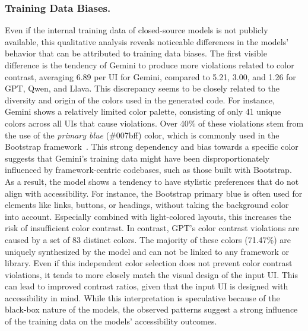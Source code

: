 \subsubsection{Training Data Biases.} Even if the 
internal training data of closed-source models is not publicly 
available, this qualitative analysis reveals noticeable differences 
in the models' behavior that can be attributed to training 
data biases.\newline
The first visible difference is the tendency of Gemini to produce 
more violations related to color contrast, averaging 
6.89 per UI for Gemini, compared to 5.21, 3.00, and 1.26 for GPT,
Qwen, and Llava. This discrepancy seems to be closely related to 
the diversity and origin of the colors used in the generated code.
For instance, Gemini shows a relatively limited color palette, 
consisting of only 41 unique colors across all UIs that cause 
violations. Over 40\% of these violations stem from the use 
of the \textit{primary blue} (\#007bff) color, which is 
commonly used in the Bootstrap framework~\cite{web:bootstrapv4}.
This strong dependency and bias towards a specific color suggests 
that Gemini's training data might have been disproportionately 
influenced by framework-centric codebases, such as those built 
with Bootstrap. As a result, the model shows a tendency to have 
stylistic preferences that do not align with accessibility.
For instance, the Bootstrap primary blue is often used for 
elements like links, buttons, or headings, without taking the 
background color into account. Especially combined with 
light-colored layouts, this increases the risk of insufficient 
color contrast. In contrast, GPT's color contrast violations are 
caused by a set of 83 distinct colors. The majority of these 
colors (71.47\%) are uniquely synthesized by the model and can not 
be linked to any framework or library. Even if this 
independent color selection does not prevent color contrast 
violations, it tends to more closely match the visual 
design of the input UI. This can lead to improved contrast ratios,
given that the input UI is designed with accessibility in mind.
While this interpretation is speculative because of the 
black-box nature of the models, the observed patterns suggest 
a strong influence of the training data on the models' accessibility
outcomes.

